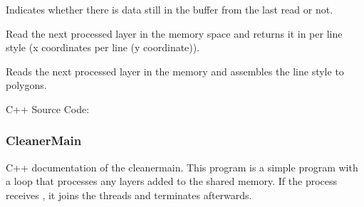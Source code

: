 \documentclass[a4paper,10pt,english]{sphinxmanual}
\begin{document}
\begin{fulllineitems}
\begin{fulllineitems}
\label{\detokenize{drc/drc:_CPPv4N13CleanerMaster4doneEv}}%
\pysigstartmultiline
{}%
\pysigstopmultiline
Indicates whether there is data still in the buffer from the last read or not.

\end{fulllineitems}


\begin{fulllineitems}
\label{\detokenize{drc/drc:_CPPv4N13CleanerMaster9get_layerEv}}%
\pysigstartmultiline
{}%
\pysigstopmultiline
Read the next processed layer in the memory space and returns it in per line style (x coordinates per line (y coordinate)).

\end{fulllineitems}


\begin{fulllineitems}
\label{\detokenize{drc/drc:_CPPv4N13CleanerMaster12get_polygonsEv}}%
\pysigstartmultiline
{}%
\pysigstopmultiline
Reads the next processed layer in the memory and assembles the line style to polygons.

\end{fulllineitems}


\end{fulllineitems}


C++ Source Code: {\hyperref[\detokenize{source_code/cleanermaster_source:cmsource}]{}}


\subsubsection{CleanerMain}
\label{\detokenize{drc/drc:cleanermain}}\label{\detokenize{drc/drc:cmain}}
C++ documentation of the cleanermain. This program is a simple program with a loop that processes any layers added to the shared memory. If the process receives , it joins the threads and terminates afterwards.
\end{document}

